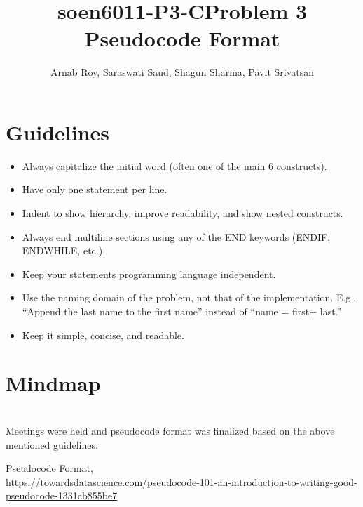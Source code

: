 \documentclass{article}
\title{soen6011-P3-C}
\title{Problem 3 Pseudocode Format}
\author{Arnab Roy, Saraswati Saud, Shagun Sharma, Pavit Srivatsan }
\date{}
\begin{document}
\maketitle

\section{Guidelines}
\begin{itemize}
\item Always capitalize the initial word (often one of the main 6 constructs).\\
\item Have only one statement per line.\\
\item Indent to show hierarchy, improve readability, and show nested constructs.\\
\item Always end multiline sections using any of the END keywords (ENDIF, ENDWHILE, etc.).\\
\item Keep your statements programming language independent.
\item Use the naming domain of the problem, not that of the implementation. E.g., “Append the last name to the first name” instead of “name = first+ last.”\\
\item Keep it simple, concise, and readable.\\
\end{itemize}
\section{Mindmap}\\
Meetings were held and pseudocode format was finalized based on the above mentioned guidelines. \\
\begin{thebibliography}{9}
Pseudocode Format,\\
\url{https://towardsdatascience.com/pseudocode-101-an-introduction-to-writing-good-pseudocode-1331cb855be7}
\end{thebibliography}
\end{document}
